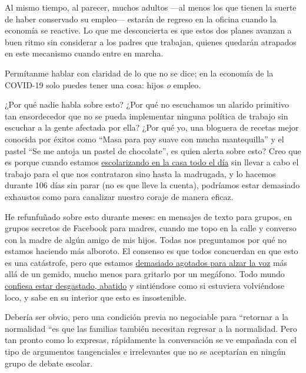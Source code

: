 Al mismo tiempo, al parecer, muchos adultos ---al menos los que tienen
la suerte de haber conservado su empleo--- estarán de regreso en la
oficina cuando la economía se reactive. Lo que me desconcierta es que
estos dos planes avanzan a buen ritmo sin considerar a los padres que
trabajan, quienes quedarán atrapados en este mecanismo cuando entre en
marcha.

Permítanme hablar con claridad de lo que no se dice; en la economía de
la COVID-19 solo puedes tener una cosa: hijos \emph{o} empleo.

¿Por qué nadie habla sobre esto? ¿Por qué no escuchamos un alarido
primitivo tan ensordecedor que no se pueda implementar ninguna política
de trabajo sin escuchar a la gente afectada por ella? ¿Por qué yo, una
bloguera de recetas mejor conocida por éxitos como ``Masa para pay suave
con mucha mantequilla'' y el pastel ``Se me antoja un pastel de
chocolate'', es quien alerta sobre esto? Creo que es porque cuando
estamos
\href{https://www.nytimes3xbfgragh.onion/2020/04/27/upshot/coronavirus-exposes-workplace-truths.html?action=click\&module=RelatedLinks\&pgtype=Article}{escolarizando
en la casa todo el día} sin llevar a cabo el trabajo para el que nos
contrataron sino hasta la madrugada, y lo hacemos durante 106 días sin
parar (no es que lleve la cuenta), podríamos estar demasiado exhaustos
como para canalizar nuestro coraje de manera eficaz.

He refunfuñado sobre esto durante meses: en mensajes de texto para
grupos, en grupos secretos de Facebook para madres, cuando me topo en la
calle y converso con la madre de algún amigo de mis hijos. Todas nos
preguntamos por qué no estamos haciendo más alboroto. El consenso es que
todos concuerdan en que esto es una catástrofe, pero que estamos
\href{https://www.nytimes3xbfgragh.onion/es/2020/05/01/espanol/escuela-casa-coronavirus.html}{demasiado
agotados para alzar la voz} más allá de un gemido, mucho menos para
gritarlo por un megáfono. Todo mundo
\href{https://www.nytimes3xbfgragh.onion/2020/06/29/opinion/coronavirus-school-reopening.html}{confiesa
estar desgastado, abatido} y sintiéndose como si estuviera volviéndose
loco, y sabe en su interior que esto es insostenible.

Debería ser obvio, pero una condición previa no negociable para
``retornar a la normalidad ``es que las familias también necesitan
regresar a la normalidad. Pero tan pronto como lo expresas, rápidamente
la conversación se ve empañada con el tipo de argumentos tangenciales e
irrelevantes que no se aceptarían en ningún grupo de debate escolar.

